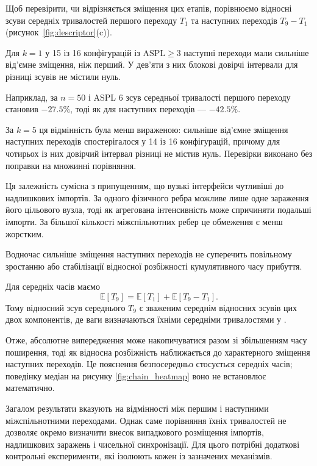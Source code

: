 Щоб перевірити, чи відрізняється
зміщення цих етапів,
порівнюємо відносні зсуви
середніх тривалостей
першого переходу $T_1$
та наступних переходів
$T_9-T_1$
(рисунок~\ref{fig:descriptor}(c)).

Для $k=1$ у 15 із 16
конфігурацій із
$\mathrm{ASPL}\geq3$
наступні переходи мали
сильніше від'ємне зміщення,
ніж перший.
У дев'яти з них
блокові довірчі інтервали
для різниці зсувів
не містили нуль.

Наприклад, за $n=50$
і ASPL 6 зсув середньої
тривалості першого переходу
становив $-27.5\%$,
тоді як для наступних
переходів --- $-42.5\%$.

За $k=5$ ця відмінність
була менш вираженою:
сильніше від'ємне
зміщення наступних
переходів спостерігалося
у 14 із 16 конфігурацій,
причому для чотирьох
із них довірчий інтервал
різниці не містив нуль.
Перевірки виконано
без поправки на множинні
порівняння.

Ця залежність сумісна
з припущенням, що вузькі
інтерфейси чутливіші
до надлишкових імпортів.
За одного фізичного ребра
можливе лише одне
зараження його цільового
вузла, тоді як агрегована
інтенсивність може
спричиняти подальші імпорти.
За більшої кількості
міжспільнотних ребер
це обмеження є менш
жорстким.

Водночас сильніше зміщення
наступних переходів
не суперечить повільному
зростанню або стабілізації
відносної розбіжності
кумулятивного часу прибуття.

Для середніх часів маємо
\begin{equation}
\mathbb{E}[T_9]
=
\mathbb{E}[T_1]
+
\mathbb{E}[T_9-T_1].
\end{equation}
Тому відносний зсув
середнього $T_9$
є зваженим середнім
відносних зсувів
цих двох компонентів,
де ваги визначаються
їхніми середніми
тривалостями у \Full{}.

Отже, абсолютне випередження
може накопичуватися разом
зі збільшенням часу поширення,
тоді як відносна розбіжність
наближається до характерного
зміщення наступних переходів.
Це пояснення безпосередньо
стосується середніх часів;
поведінку медіан на рисунку
\ref{fig:chain_heatmap} воно
не встановлює математично.

Загалом результати вказують
на відмінності між першим
і наступними міжспільнотними
переходами. Однак саме
порівняння їхніх тривалостей
не дозволяє окремо визначити
внесок випадкового розміщення
імпортів, надлишкових
заражень і чисельної
синхронізації.
Для цього потрібні додаткові
контрольні експерименти,
які ізолюють кожен
із зазначених механізмів.







